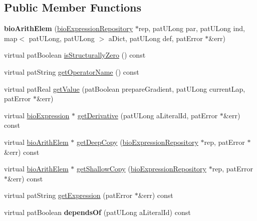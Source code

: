 \subsection*{Public Member Functions}
\begin{DoxyCompactItemize}
\item 
\mbox{\label{classbio_arith_elem_ae74bb8f951dc8a93bd5b957df741a968}} 
{\bfseries bio\+Arith\+Elem} (\hyperlink{classbio_expression_repository}{bio\+Expression\+Repository} $\ast$rep, pat\+U\+Long par, pat\+U\+Long ind, map$<$ pat\+U\+Long, pat\+U\+Long $>$ a\+Dict, pat\+U\+Long def, pat\+Error $\ast$\&err)
\item 
virtual pat\+Boolean \hyperlink{classbio_arith_elem_a9d64d5197cb2cab10396c3e9d8add42b}{is\+Structurally\+Zero} () const
\item 
virtual pat\+String \hyperlink{classbio_arith_elem_a501dc3818a694f54765ad69a4a67279e}{get\+Operator\+Name} () const
\item 
virtual pat\+Real \hyperlink{classbio_arith_elem_aac719574ab496e1b3341b9e4b71a7986}{get\+Value} (pat\+Boolean prepare\+Gradient, pat\+U\+Long current\+Lap, pat\+Error $\ast$\&err)
\item 
virtual \hyperlink{classbio_expression}{bio\+Expression} $\ast$ \hyperlink{classbio_arith_elem_a0905b898fe28bad14df85cd2bbcf1e1c}{get\+Derivative} (pat\+U\+Long a\+Literal\+Id, pat\+Error $\ast$\&err) const
\item 
virtual \hyperlink{classbio_arith_elem}{bio\+Arith\+Elem} $\ast$ \hyperlink{classbio_arith_elem_a3635350e02e428a9fe9dfeaac6247514}{get\+Deep\+Copy} (\hyperlink{classbio_expression_repository}{bio\+Expression\+Repository} $\ast$rep, pat\+Error $\ast$\&err) const
\item 
virtual \hyperlink{classbio_arith_elem}{bio\+Arith\+Elem} $\ast$ \hyperlink{classbio_arith_elem_a481ee9025662995608714643a1239a26}{get\+Shallow\+Copy} (\hyperlink{classbio_expression_repository}{bio\+Expression\+Repository} $\ast$rep, pat\+Error $\ast$\&err) const
\item 
virtual pat\+String \hyperlink{classbio_arith_elem_a729f5a91619948fa58f7b4902741a2f4}{get\+Expression} (pat\+Error $\ast$\&err) const
\item 
\mbox{\label{classbio_arith_elem_aabc496888ad863c815d95dc1a7bbd2a3}} 
virtual pat\+Boolean {\bfseries depends\+Of} (pat\+U\+Long a\+Literal\+Id) const
\item 

\end{DoxyCompactItemize}
